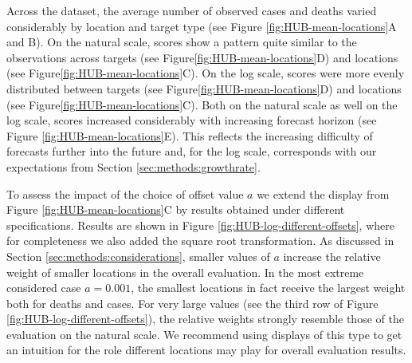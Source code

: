\documentclass{article}
\begin{document}
Across the dataset, the average number of observed cases and deaths varied considerably by location and target type (see Figure \ref{fig:HUB-mean-locations}A and B). On the natural scale, scores show a pattern quite similar to the observations across targets (see Figure\ref{fig:HUB-mean-locations}D) and locations (see Figure\ref{fig:HUB-mean-locations}C). On the log scale, scores were more evenly distributed between targets (see Figure\ref{fig:HUB-mean-locations}D) and locations (see Figure\ref{fig:HUB-mean-locations}C). Both on the natural scale as well on the log scale, scores increased considerably with increasing forecast horizon (see Figure \ref{fig:HUB-mean-locations}E). This reflects the increasing difficulty of forecasts further into the future and, for the log scale, corresponds with our expectations from Section \ref{sec:methods:growthrate}. 

To assess the impact of the choice of offset value $a$ we extend the display from Figure \ref{fig:HUB-mean-locations}C by results obtained under different specifications. Results are shown in Figure \ref{fig:HUB-log-different-offsets}, where for completeness we also added the square root transformation. As discussed in Section \ref{sec:methods:considerations}, smaller values of $a$ increase the relative weight of smaller locations in the overall evaluation. In the most extreme considered case $a = 0.001$, the smallest locations in fact receive the largest weight both for deaths and cases. For very large values (see the third row of Figure \ref{fig:HUB-log-different-offsets}), the relative weights strongly resemble those of the evaluation on the natural scale. We recommend using displays of this type to get an intuition for the role different locations may play for overall evaluation results.
\end{document}
